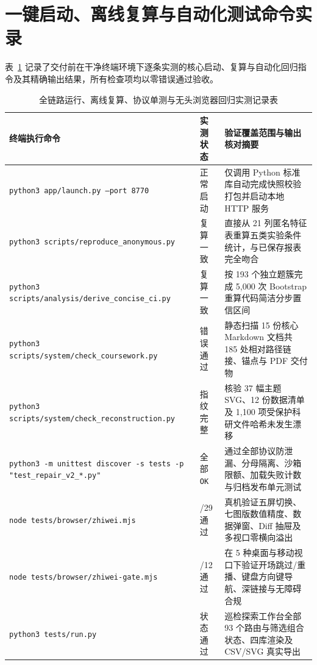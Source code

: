 \section{一键启动、离线复算与自动化测试命令实录}

表~\ref{tab:app-h-qa-log} 记录了交付前在干净终端环境下逐条实测的核心启动、复算与自动化回归指令及其精确输出结果，所有检查项均以零错误通过验收。

{\setlength{\parfillskip}{0pt plus 1fil}
\begin{table}[!htbp]
\centering
\caption{全链路运行、离线复算、协议单测与无头浏览器回归实测记录表}\label{tab:app-h-qa-log}
\ReportTableStyle
\begin{tabularx}{\linewidth}{@{}>{\raggedright\arraybackslash}p{5.6cm} >{\raggedright\arraybackslash}p{1.9cm} >{\raggedright\arraybackslash}X@{}}
\toprule
\textbf{终端执行命令} & \textbf{实测状态} & \textbf{验证覆盖范围与输出核对摘要} \\
\midrule
\texttt{python3 app/launch.py --port 8770} & 正常启动 & 仅调用 Python 标准库自动完成快照校验打包并启动本地 HTTP 服务 \\
\texttt{python3 scripts/reproduce\_anonymous.py} & 复算一致 & 直接从 21 列匿名特征表重算五类实验条件统计，与已保存报表完全吻合 \\
\texttt{python3 scripts/analysis/derive\_concise\_ci.py} & 复算一致 & 按 193 个独立题簇完成 5,000 次 Bootstrap 重算代码简洁分步置信区间 \\
\texttt{python3 scripts/system/check\_coursework.py} & 0 错误通过 & 静态扫描 15 份核心 Markdown 文档共 185 处相对路径链接、锚点与 PDF 交付物 \\
\texttt{python3 scripts/system/check\_reconstruction.py} & 指纹完整 & 核验 37 幅主题 SVG、12 份数据清单及 1,100 项受保护科研文件哈希未发生漂移 \\
\texttt{python3 -m unittest discover -s tests -p "test\_repair\_v2\_*.py"} & 全部 \texttt{OK} & 通过全部协议防泄漏、分母隔离、沙箱限额、加载失败计数与归档发布单元测试 \\
\texttt{node tests/browser/zhiwei.mjs} & 29/29 通过 & 真机验证五屏切换、七图版数值精度、数据弹窗、Diff 抽屉及多视口零横向溢出 \\
\texttt{node tests/browser/zhiwei-gate.mjs} & 12/12 通过 & 在 5 种桌面与移动视口下验证开场跳过/重播、键盘方向键导航、深链接与无障碍合规 \\
\texttt{python3 tests/run.py} & 93 状态通过 & 巡检探索工作台全部 93 个路由与筛选组合状态、四库渲染及 CSV/SVG 真实导出 \\
\bottomrule
\end{tabularx}
\end{table}}



